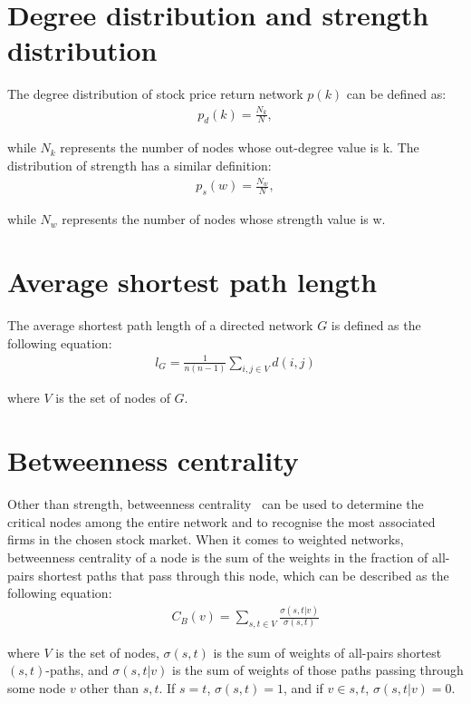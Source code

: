 \section{Degree distribution and strength distribution}
The degree distribution of stock price return network $p(k)$ can be defined as:
\begin{eqnarray}
p_d(k)=\frac{N_k}{N},
\end{eqnarray}

while $N_k$ represents the number of nodes whose out-degree value is k. The distribution of strength has a similar definition:
\begin{eqnarray}
p_s(w)=\frac{N_w}{N},
\end{eqnarray}

while $N_w$ represents the number of nodes whose strength value is w.

\section{Average shortest path length}
The average shortest path length of a directed network $G$ is defined as the following equation:
\begin{eqnarray}
l_G=\frac{1}{n(n-1)}\sum_{i,j\in V}{d(i,j)}
\end{eqnarray}

where $V$ is the set of nodes of $G$.

\section{Betweenness centrality}

Other than strength, betweenness centrality~\cite{freeman1977set} can be used to determine the critical nodes among the entire network and to recognise the most associated firms in the chosen stock market. When it comes to weighted networks, betweenness centrality of a node is the sum of the weights in the fraction of all-pairs shortest paths that pass through this node, which can be described as the following equation:
\begin{eqnarray}
&&C_B(v)=\sum_{s,t \in V}\frac{\sigma(s,t|v)}{\sigma(s,t)}
\end{eqnarray}

where $V$ is the set of nodes, $\sigma(s,t)$ is the sum of weights of all-pairs shortest $(s,t)$-paths, and $\sigma(s,t|v)$ is the sum of weights of those paths passing through some node $v$ other than $s,t$. If $s=t$, $\sigma(s,t)=1$, and if $v\in s,t$, $\sigma(s,t|v)=0$.

